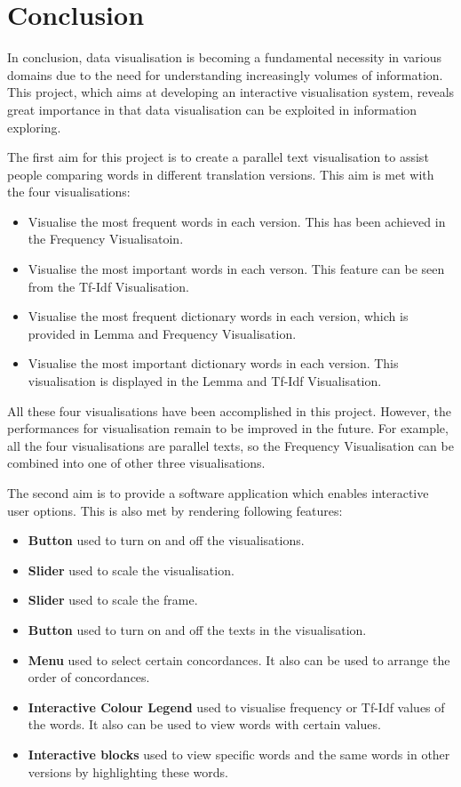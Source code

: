 \section{Conclusion}
In conclusion, data visualisation is becoming a fundamental necessity in various domains due to the need for understanding increasingly volumes of information. This project, which aims at developing an interactive visualisation system, reveals great importance in that data visualisation can be exploited in information exploring. 

The first aim for this project is to create a parallel text visualisation to assist people comparing words in different translation versions. This aim is met with the four visualisations:
\begin{itemize}
	\item \textbf{} Visualise the most frequent words in each version. This has been achieved in the Frequency Visualisatoin.
	\item \textbf{} Visualise the most important words in each verson. This feature can be seen from the Tf-Idf Visualisation.
	\item \textbf{} Visualise the most frequent dictionary words in each version, which is provided in Lemma and Frequency Visualisation.
	\item \textbf{} Visualise the most important dictionary words in each version. This visualisation is displayed in the Lemma and Tf-Idf Visualisation.
\end{itemize}
All these four visualisations have been accomplished in this project. However, the performances for visualisation remain to be improved in the future. For example, all the four visualisations are parallel texts, so the Frequency Visualisation can be combined into one of other three visualisations.  

The second aim is to provide a software application which enables interactive user options. This is also met by rendering following features:
\begin{itemize}
	\item \textbf{Button} used to turn on and off the visualisations. 
	\item \textbf{Slider} used to scale the visualisation.
	\item \textbf{Slider} used to scale the frame.
	\item \textbf{Button} used to turn on and off the texts in the visualisation.
	\item \textbf{Menu} used to select certain concordances. It also can be used to arrange the order of concordances.
	\item \textbf{Interactive Colour Legend} used to visualise frequency or Tf-Idf values of the words. It also can be used to view words with certain values.
	\item \textbf{Interactive blocks} used to view specific words and the same words in other versions by highlighting these words.	
\end{itemize}

